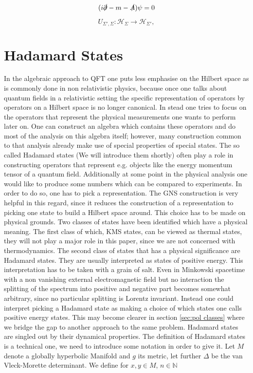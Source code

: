 \documentclass[a4paper,11pt]{article}
\begin{document}

\begin{equation}
(i\slashed{\partial} - m - \slashed{A})\psi = 0
\end{equation}

\begin{equation}
U_{\Sigma',\Sigma}:\mathcal{H}_\Sigma \rightarrow \mathcal{H}_{\Sigma'},
\end{equation}

\section{Hadamard States}
In the algebraic approach to QFT one puts less emphasise on the Hilbert space as is commonly done in non relativistic physics, because 
once one talks about quantum fields in a relativistic setting the specific representation of operators by operators on a Hilbert 
space is no longer canonical. 
In stead one tries to focus on the operators that represent the physical measurements one wants to perform later on. 
One can construct an algebra which contains these operators and do most of the analysis on this algebra itself; however, 
many construction common to that analysis already make use of special properties of special states. The so called Hadamard states 
(We will introduce them shortly) often play a role in constructing operators that represent e.g. objects like the energy 
momentum tensor of a quantum field. Additionally at some point in
the physical analysis one would like to produce some numbers which can be compared to experiments. In order to do so, one
has to pick a representation. The GNS construction is very helpful in this regard, since it reduces the construction of a representation to 
picking one state to build a Hilbert space around. This choice has to be made on physical grounds. Two classes of states have been
identified which have a physical meaning. 
The first class of which, KMS states, can be viewed as thermal states, they will
not play a major role in this paper, since we are not concerned with thermodynamics. 
The second class of states that has a physical 
significance are Hadamard states. They are usually interpreted as states of positive energy. This interpretation has to be taken with 
a grain of salt. Even in Minkowski spacetime with a non vanishing external electromagnetic field but no interaction the splitting of the
spectrum into positive and negative part becomes somewhat arbitrary, since no particular splitting is Lorentz invariant\cite{something!}.
Instead one could interpret picking a Hadamard state as making a choice of which states one
calls positive energy states. This may become clearer in section \ref{sec:pol classes} where we bridge the gap to another approach to
the same problem. Hadamard states are singled out by their dynamical properties. The definition of Hadamard states is a technical one, we 
need to introduce some notation in order to give it. Let \(M\) denote a globally hyperbolic Manifold and \(g\) its metric, let further \(\Delta\) be the van Vleck-Morette determinant\cite{Dewitt1960}. We define for \(x,y\in M\), \(n\in\mathbb{N}\)
\end{document}
